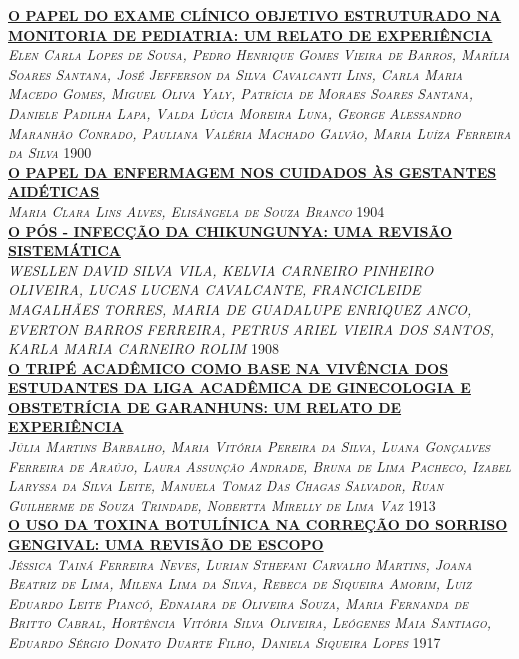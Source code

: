 \noindent \textsc{\hyperlink{trabalhos/251622.pdf.1}{\textbf{O PAPEL DO EXAME CLÍNICO OBJETIVO ESTRUTURADO NA MONITORIA DE PEDIATRIA: UM RELATO DE EXPERIÊNCIA}}}\\ 
\noindent \textsc{\textit{Elen Carla Lopes de Sousa, Pedro Henrique Gomes Vieira de Barros, Marília Soares Santana, José Jefferson da Silva Cavalcanti Lins, Carla Maria Macedo Gomes, Miguel Oliva Yaly, Patrícia de Moraes Soares Santana, Daniele Padilha Lapa, Valda Lúcia Moreira Luna, George Alessandro Maranhão Conrado, Pauliana Valéria Machado Galvão, Maria Luíza Ferreira da Silva}} \hfill 1900\\ 

\noindent \textsc{\hyperlink{trabalhos/250235.pdf.1}{\textbf{O PAPEL DA ENFERMAGEM NOS CUIDADOS ÀS GESTANTES AIDÉTICAS}}}\\ 
\noindent \textsc{\textit{Maria Clara Lins Alves, Elisângela de Souza Branco}} \hfill 1904\\ 

\noindent \textsc{\hyperlink{trabalhos/250386.pdf.1}{\textbf{O PÓS - INFECÇÃO DA CHIKUNGUNYA: UMA REVISÃO SISTEMÁTICA}}}\\ 
\noindent \textsc{\textit{WESLLEN DAVID SILVA VILA, KELVIA CARNEIRO PINHEIRO OLIVEIRA, LUCAS LUCENA CAVALCANTE, FRANCICLEIDE MAGALHÃES TORRES, MARIA DE GUADALUPE ENRIQUEZ ANCO, EVERTON BARROS FERREIRA, PETRUS ARIEL VIEIRA DOS SANTOS, KARLA MARIA CARNEIRO ROLIM}} \hfill 1908\\ 

\noindent \textsc{\hyperlink{trabalhos/251684.pdf.1}{\textbf{O TRIPÉ ACADÊMICO COMO BASE NA VIVÊNCIA DOS ESTUDANTES DA LIGA ACADÊMICA DE GINECOLOGIA E OBSTETRÍCIA DE GARANHUNS: UM RELATO DE EXPERIÊNCIA}}}\\ 
\noindent \textsc{\textit{Júlia Martins Barbalho, Maria Vitória Pereira da Silva, Luana Gonçalves Ferreira de Araújo, Laura Assunção Andrade, Bruna de Lima Pacheco, Izabel Laryssa da Silva Leite, Manuela Tomaz Das Chagas Salvador, Ruan Guilherme de Souza Trindade, Nobertta Mirelly de Lima Vaz}} \hfill 1913\\ 

\noindent \textsc{\hyperlink{trabalhos/250593.pdf.1}{\textbf{O USO DA TOXINA BOTULÍNICA NA CORREÇÃO DO SORRISO GENGIVAL: UMA REVISÃO DE ESCOPO}}}\\ 
\noindent \textsc{\textit{Jéssica Tainá Ferreira Neves, Lurian Sthefani Carvalho Martins, Joana Beatriz de Lima, Milena Lima da Silva, Rebeca de Siqueira Amorim, Luiz Eduardo Leite Piancó, Ednaiara de Oliveira Souza, Maria Fernanda de Britto Cabral, Hortência Vitória Silva Oliveira, Leógenes Maia Santiago, Eduardo Sérgio Donato Duarte Filho, Daniela Siqueira Lopes}} \hfill 1917\\ 

